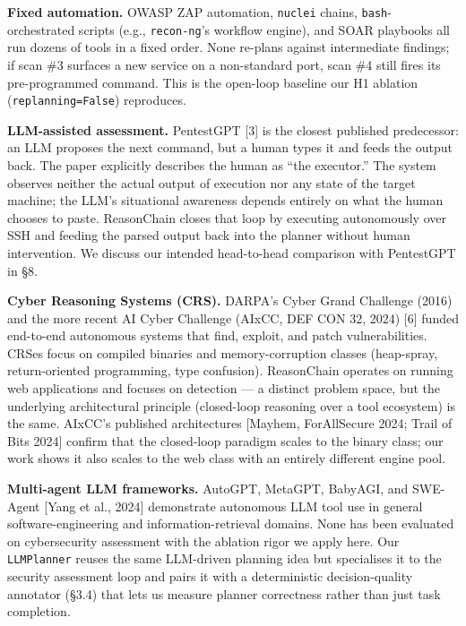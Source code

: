 \documentclass[
]{article}
\begin{document}
\textbf{Fixed automation.} OWASP ZAP automation, \texttt{nuclei} chains,
\texttt{bash}-orchestrated scripts (e.g., \texttt{recon-ng}'s workflow
engine), and SOAR playbooks all run dozens of tools in a fixed order.
None re-plans against intermediate findings; if scan \#3 surfaces a new
service on a non-standard port, scan \#4 still fires its pre-programmed
command. This is the open-loop baseline our H1 ablation
(\texttt{replanning=False}) reproduces.

\textbf{LLM-assisted assessment.} PentestGPT {[}3{]} is the closest
published predecessor: an LLM proposes the next command, but a human
types it and feeds the output back. The paper explicitly describes the
human as ``the executor.'' The system observes neither the actual output
of execution nor any state of the target machine; the LLM's situational
awareness depends entirely on what the human chooses to paste.
ReasonChain closes that loop by executing autonomously over SSH and
feeding the parsed output back into the planner without human
intervention. We discuss our intended head-to-head comparison with
PentestGPT in §8.

\textbf{Cyber Reasoning Systems (CRS).} DARPA's Cyber Grand Challenge
(2016) and the more recent AI Cyber Challenge (AIxCC, DEF CON 32, 2024)
{[}6{]} funded end-to-end autonomous systems that find, exploit, and
patch vulnerabilities. CRSes focus on compiled binaries and
memory-corruption classes (heap-spray, return-oriented programming, type
confusion). ReasonChain operates on running web applications and focuses
on detection --- a distinct problem space, but the underlying
architectural principle (closed-loop reasoning over a tool ecosystem) is
the same. AIxCC's published architectures {[}Mayhem, ForAllSecure 2024;
Trail of Bits 2024{]} confirm that the closed-loop paradigm scales to
the binary class; our work shows it also scales to the web class with an
entirely different engine pool.

\textbf{Multi-agent LLM frameworks.} AutoGPT, MetaGPT, BabyAGI, and
SWE-Agent {[}Yang et al., 2024{]} demonstrate autonomous LLM tool use in
general software-engineering and information-retrieval domains. None has
been evaluated on cybersecurity assessment with the ablation rigor we
apply here. Our \texttt{LLMPlanner} reuses the same LLM-driven planning
idea but specialises it to the security assessment loop and pairs it
with a deterministic decision-quality annotator (§3.4) that lets us
measure planner correctness rather than just task completion.
\end{document}

